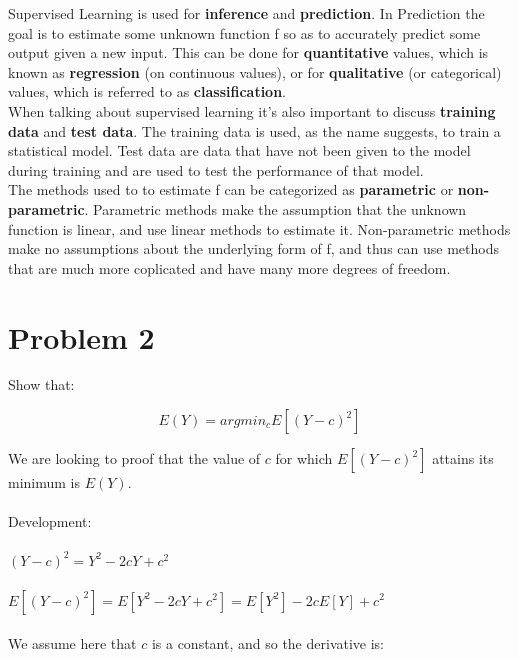 \documentclass[11pt,a4paper,twoside,openright]{report}
\begin{document}
	
	\noindent Supervised Learning is used for \textbf{inference} and \textbf{prediction}. In Prediction the goal is to estimate some unknown function f so as to accurately predict some output given a new input. This can be done for \textbf{quantitative} values, which is known as \textbf{regression} (on continuous values), or for \textbf{qualitative} (or categorical) values, which is referred to as \textbf{classification}.\\
	
	
	\noindent When talking about supervised learning it's also important to discuss \textbf{training data} and \textbf{test data}. The training data is used, as the name suggests, to train a statistical model. Test data are data that have not been given to the model during training and are used to test the performance of that model.\\
	
	
	\noindent The methods used to to estimate f can be categorized as \textbf{parametric} or \textbf{non-parametric}. Parametric methods make the assumption that the unknown function is linear, and use linear methods to estimate it. Non-parametric methods make no assumptions about the underlying form of f, and thus can use methods that are much more coplicated and have many more degrees of freedom.\\
	
	
	\section*{Problem 2}
	
	
	Show that:
	
	\[ E(Y) = argmin_{c}E[(Y-c)^2] \]
	
	We are looking to proof that the value of $c$ for which $E[(Y-c)^2]$ attains its minimum is $E(Y)$.\\\\
	
	
	Development:\\\\
	 
	
	$ (Y-c)^2 = Y^2 - 2cY + c^2 $\\\\
	
	
	
	$ E[(Y-c)^2] = E[Y^2 - 2cY + c^2] = E[Y^2] - 2cE[Y] + c^2	$\\\\
	
	 We assume here that $c$ is a constant, and so the derivative is: \\\\
	 
\end{document}
